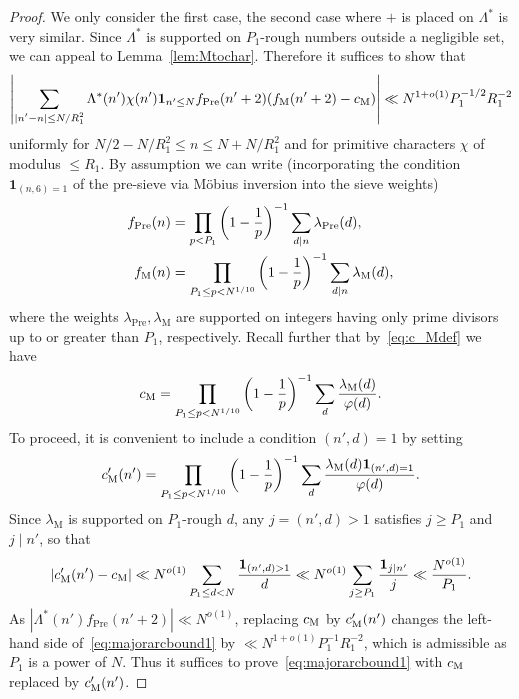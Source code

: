 \documentclass[12pt]{amsart}
\theoremstyle{definition}
\theoremstyle{remark}
\numberwithin{equation}{section}
\newcommand{\1}{\mathbf{1}}
\begin{document}
\begin{proof}
We only consider the first case, the second case where $+$ is placed on $\Lambda^{*}$ is very similar. Since $\Lambda^*$ is supported on $P_1$-rough numbers outside a negligible set, we can appeal to Lemma~\ref{lem:Mtochar}. 
Therefore it suffices to show that
\begin{align}\label{eq:majorarcbound1}
\left|\sum_{\substack{|n'-n|\leq N/R_1^2 \\ }}\Lambda^*(n')\chi(n')\1_{n'\leq N} f_{\mathrm{{Pre}}}(n'+2)(f_{\mathrm{{M}}}(n'+2)-c_{\textup{M}})\right|\ll N^{1+o(1)} P_1^{-1/2} R_1^{-2}
\end{align}
uniformly for $N/2-N/R_1^2\leq n\leq N+N/R_1^2$ and for primitive characters $\chi$ of modulus $\leq R_1$.
By assumption we can write (incorporating the condition $\1_{(n,6)=1}$ of the pre-sieve via M\"obius inversion into the sieve weights)
  \begin{align*}
      f_{\mathrm{{Pre}}}(n)&=\prod_{p < P_1}\left(1-\frac{1}{p}\right)^{-1}\sum_{d\mid n}\lambda_{\mathrm{Pre}}(d),\\
      f_\textup{M}(n)&=\prod_{P_1\le p < N^{1/10}}\left(1-\frac{1}{p}\right)^{-1}\sum_{d\mid n}\lambda_{\mathrm{M}}(d),
  \end{align*}
  where the weights $\lambda_{\mathrm{Pre}},  \lambda_{\mathrm{M}}$ are supported on integers having only prime divisors up to or greater than $P_1$, respectively. Recall further that by~\eqref{eq:c_Mdef} we have
  \begin{align*}
      c_{\textup{M}}=\prod_{P_1\le p < N^{1/10}} \left(1-\frac{1}{p}\right)^{-1}\sum_{d}\frac{\lambda_{\mathrm{M}}(d)}{\varphi(d)}.
  \end{align*}
To proceed, it is convenient to include a condition $(n',d)=1$ by setting
  \begin{align*}
      c'_{\textup{M}}(n')=\prod_{P_1\le p < N^{1/10}} \left(1-\frac{1}{p}\right)^{-1}\sum_{d}\frac{\lambda_{\mathrm{M}}(d)\1_{(n',d)=1}}{\varphi(d)}.
  \end{align*}
Since $\lambda_{\mathrm{M}}$ is supported on $P_1$-rough $d$, any $j=(n',d)>1$ satisfies $j\geq P_1$ and $j\mid n'$, so that
  \begin{align*}
      |c'_{\textup{M}}(n')-c_{\textup{M}}|\ll N^{o(1)} \sum_{P_1\leq d < N} \frac{\1_{(n',d)>1}}{d} \ll N^{o(1)} \sum_{j\geq P_1} \frac{\1_{j\mid n'}}{j}  \ll \frac{N^{o(1)} }{P_1}.
  \end{align*}
As $|\Lambda^*(n')f_{\mathrm{{Pre}}}(n'+2)|\ll N^{o(1)}$, replacing $c_{\textup{M}}$ by $c'_{\textup{M}}(n')$ changes the left-hand side of~\eqref{eq:majorarcbound1} by $\ll N^{1+o(1)}P_1^{-1}R_1^{-2}$, which is admissible as $P_1$ is a power of $N$. Thus it suffices to prove~\eqref{eq:majorarcbound1} with $c_{\textup{M}}$ replaced by $c'_{\textup{M}}(n')$.


\end{proof}
\end{document}
